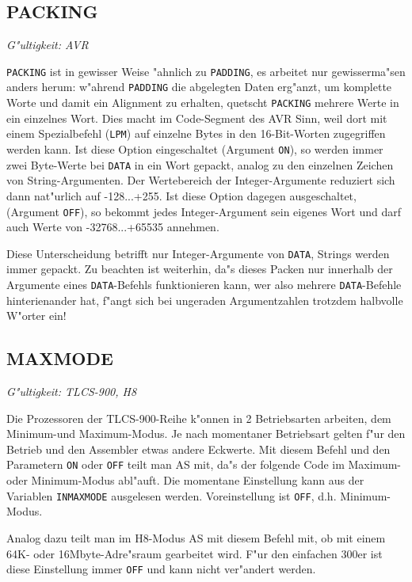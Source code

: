 \documentclass[12pt,a4paper,twoside]{report}
\makeatletter
\newcommand{\tty}[1]{{\tt #1}}
\newcommand{\ttindex}[1]{\index{#1@{\tt #1}}}
\makeatother
\begin{document}
{%

\subsection{PACKING}
\ttindex{PACKING}

{\em G"ultigkeit: AVR}

{\tt PACKING} ist in gewisser Weise "ahnlich zu {\tt PADDING}, es arbeitet
nur gewisserma"sen anders herum: w"ahrend {\tt PADDING} die
abgelegten Daten erg"anzt, um komplette Worte und damit ein Alignment zu
erhalten, quetscht {\tt PACKING} mehrere Werte in ein einzelnes Wort. 
Dies macht im Code-Segment des AVR Sinn, weil dort mit einem Spezialbefehl
({\tt LPM}) auf einzelne Bytes in den 16-Bit-Worten zugegriffen werden
kann.  Ist diese Option eingeschaltet (Argument {\tt ON}), so werden immer
zwei Byte-Werte bei {\tt DATA} in ein Wort gepackt, analog zu den
einzelnen Zeichen von String-Argumenten.  Der Wertebereich der
Integer-Argumente reduziert sich dann nat"urlich auf -128...+255.  Ist
diese Option dagegen ausgeschaltet, (Argument {\tt OFF}), so bekommt
jedes Integer-Argument sein eigenes Wort und darf auch Werte von
-32768...+65535 annehmen.

Diese Unterscheidung betrifft nur Integer-Argumente von {\tt DATA},
Strings werden immer gepackt.  Zu beachten ist weiterhin, da"s dieses
Packen nur innerhalb der Argumente eines {\tt DATA}-Befehls funktionieren
kann, wer also mehrere {\tt DATA}-Befehle hinterienander hat, f"angt sich
bei ungeraden Argumentzahlen trotzdem halbvolle W"orter ein!


\subsection{MAXMODE}
\ttindex{MAXMODE}

{\em G"ultigkeit: TLCS-900, H8}

Die Prozessoren der TLCS-900-Reihe k"onnen in 2 Betriebsarten arbeiten,
dem Minimum-und Maximum-Modus.  Je nach momentaner Betriebsart gelten
f"ur den Betrieb und den Assembler etwas andere Eckwerte.  Mit diesem Befehl
und den Parametern \tty{ON} oder \tty{OFF} teilt man AS mit, da"s der
folgende Code im Maximum- oder Minimum-Modus abl"auft.  Die momentane
Einstellung kann aus der Variablen \tty{INMAXMODE} ausgelesen werden.
Voreinstellung ist \tty{OFF}, d.h. Minimum-Modus.
\par
Analog dazu teilt man im H8-Modus AS mit diesem Befehl mit, ob
mit einem 64K- oder 16Mbyte-Adre"sraum gearbeitet wird.  F"ur den
einfachen 300er ist diese Einstellung immer \tty{OFF} und kann nicht
ver"andert werden.

}
\end{document}
